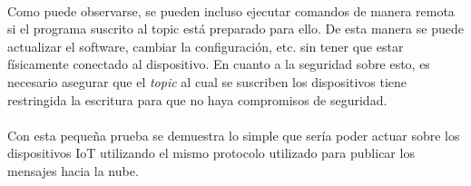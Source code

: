 \documentclass[../../memoria.tex]{subfiles}
\begin{document}
\paragraph{}
Como puede observarse, se pueden incluso ejecutar comandos de manera remota si el programa suscrito al topic está preparado para ello. De esta manera se puede actualizar el software, cambiar la configuración, etc. sin tener que estar físicamente conectado al dispositivo. En cuanto a la seguridad sobre esto, es necesario asegurar que el \textit{topic} al cual se suscriben los dispositivos tiene restringida la escritura para que no haya compromisos de seguridad.

\paragraph{}
Con esta pequeña prueba se demuestra lo simple que sería poder actuar sobre los dispositivos IoT utilizando el mismo protocolo utilizado para publicar los mensajes hacia la nube.
\end{document}
